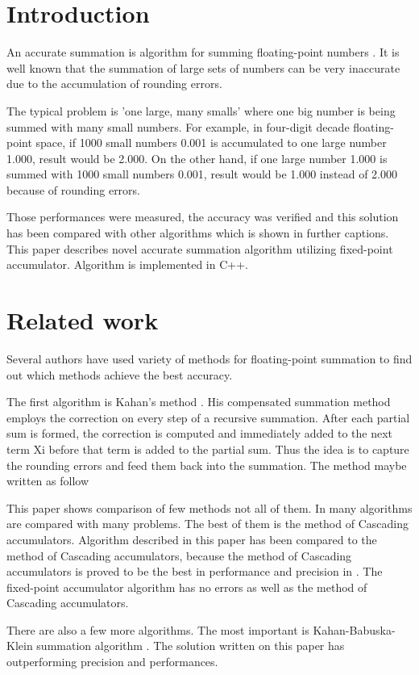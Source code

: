 \documentclass[conference]{IEEEtran}
\begin{document}
\section{Introduction}
An accurate summation \cite{Higham} is algorithm for summing 
floating-point numbers \cite{WhatShouldKnowAboutFP}. It is well known that the summation 
of large sets of numbers can be very inaccurate due
to the accumulation of rounding errors. 
\par
The typical problem is 'one large, many smalls' \cite{ComparisonOfMethods} 
where one big number is being summed with many small numbers. 
For example, in four-digit decade floating-point space,
if 1000 small numbers 0.001 is accumulated to one large 
number 1.000, result would be 2.000. On the other hand,
if one large number 1.000 is summed with 1000 small numbers 0.001,
result would be 1.000 instead of 2.000 because of rounding errors.
\par
Those performances were measured, the accuracy was verified and this 
solution has been compared with other algorithms which is 
shown in further captions. This paper describes novel accurate 
summation algorithm utilizing fixed-point accumulator.
Algorithm is implemented in C++.


\section{Related work}
Several authors have used variety of methods for floating-point 
summation to find out which methods achieve the best accuracy. 
\par
The first algorithm is Kahan's method \cite{ComparisonOfMethods}. 
His compensated summation method employs the correction 
on every step of a recursive summation. After each partial 
sum is formed, the correction is computed and immediately added 
to the next term Xi before that term is added to the partial
sum. Thus the idea is to capture the rounding errors and feed 
them back into the summation. The method maybe written as follow
\par 
This paper shows comparison of few methods not all of them.
In \cite{ComparisonOfMethods, CascadingAccumulators} many algorithms 
are compared with many problems. The best of them is the method of Cascading 
accumulators. Algorithm described in this paper has been compared to the method of Cascading 
accumulators, because the method of Cascading accumulators is proved 
to be the best in performance and precision in \cite{ComparisoOfMethods}.
The fixed-point accumulator algorithm has no errors as well as the method of Cascading 
accumulators.
\par
There are also a few more algorithms. 
The most important is Kahan-Babuska-Klein summation algorithm \cite{KahanBabuskaKlein}.
The solution written on this paper has outperforming precision and performances.
\end{document}
